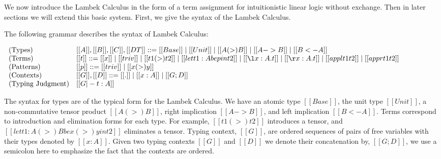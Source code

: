 We now introduce the Lambek Calculus in the form of a term assignment
for intuitionistic linear logic without exchange.  Then in later
sections we will extend this basic system. First, we give the syntax
of the Lambek Calculus.
\begin{definition}
  \label{def:Lambek-syntax}
  The following grammar describes the syntax of Lambek Calculus:
  \begin{center}
    \begin{math}
      \begin{array}{lll}
        \text{(Types)} & [[A]],[[B]],[[C]],[[DT]] ::= [[Base]] \mid [[Unit]] \mid [[A (>) B]] \mid [[A -> B]] \mid [[B <- A]]\\
        \text{(Terms)} & [[t]] ::= [[x]] \mid [[triv]] \mid [[t1 (>) t2]] \mid [[let t1 : A be p in t2]] \mid [[\l x : A.t]] \mid [[\r x : A . t]] \mid [[appl t1 t2]] \mid [[appr t1 t2]]\\
        \text{(Patterns)} & [[p]] ::= [[triv]] \mid [[x (>) y]]\\
        \text{(Contexts)} & [[G]],[[D]] ::= [[.]] \mid [[x : A]] \mid [[G;D]]\\
        \text{(Typing Judgment)} & [[G |- t : A]]\\
      \end{array}
    \end{math}
  \end{center}
\end{definition}

The syntax for types are of the typical form for the Lambek Calculus.
We have an atomic type $[[Base]]$, the unit type $[[Unit]]$, a
non-commutative tensor product $[[A (>) B]]$, right implication $[[A
    -> B]]$, and left implication $[[B <- A]]$.  Terms correspond to
introduction and elimination forms for each type.  For example, $[[t1
    (>) t2]]$ introduces a tensor, and $[[let t1 : A (>) B be x (>) y
    in t2]]$ eliminates a tensor.  Typing context, $[[G]]$, are
ordered sequences of pairs of free variables with their types denoted
by $[[x : A]]$.  Given two typing contexts $[[G]]$ and $[[D]]$ we
denote their concatenation by, $[[G;D]]$, we use a semicolon here to
emphasize the fact that the contexts are ordered.

